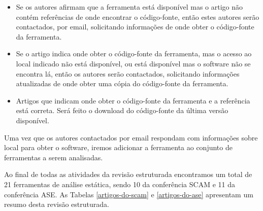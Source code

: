 \begin{itemize}

  \item Se os autores afirmam que a ferramenta está disponível mas o artigo
    não contém referências de onde encontrar o código-fonte, então estes
    autores serão contactados, por email, solicitando informações de onde
    obter o código-fonte da ferramenta.

  \item Se o artigo indica onde obter o código-fonte da ferramenta, mas o acesso ao local
    indicado não está disponível, ou está disponível mas o software não se
    encontra lá, então os autores serão contactados, solicitando informações
    atualizadas de onde obter uma cópia do código-fonte da ferramenta.

  \item Artigos que indicam onde obter o código-fonte da ferramenta e a referência
    está correta. Será feito o download do código-fonte da última versão
    disponível.

\end{itemize}

Uma vez que os autores contactados por email respondam com informações sobre
local para obter o software, iremos adicionar a ferramenta ao conjunto de ferramentas
a serem analisadas.

Ao final de todas as atividades da revisão estruturada encontramos um total de
21 ferramentas de análise estática, sendo 10 da conferência SCAM e 11 da
conferência ASE. As Tabelas \ref{artigos-do-scam} e \ref{artigos-do-ase}
apresentam um resumo desta revisão estruturada.

